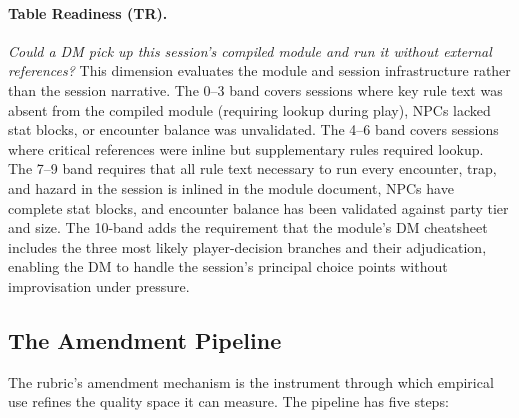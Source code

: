 \paragraph{Table Readiness (TR).}
\textit{Could a DM pick up this session's compiled module and run it without external
references?}
This dimension evaluates the module and session infrastructure rather than the session
narrative. The 0--3 band covers sessions where key rule text was absent from the
compiled module (requiring lookup during play), NPCs lacked stat blocks, or encounter
balance was unvalidated. The 4--6 band covers sessions where critical references were
inline but supplementary rules required lookup. The 7--9 band requires that all rule
text necessary to run every encounter, trap, and hazard in the session is inlined in
the module document, NPCs have complete stat blocks, and encounter balance has been
validated against party tier and size. The 10-band adds the requirement that the
module's DM cheatsheet includes the three most likely player-decision branches and
their adjudication, enabling the DM to handle the session's principal choice points
without improvisation under pressure.

\subsection{The Amendment Pipeline}
\label{sec:amendment-pipeline}

The rubric's amendment mechanism is the instrument through which empirical use refines
the quality space it can measure. The pipeline has five steps:

